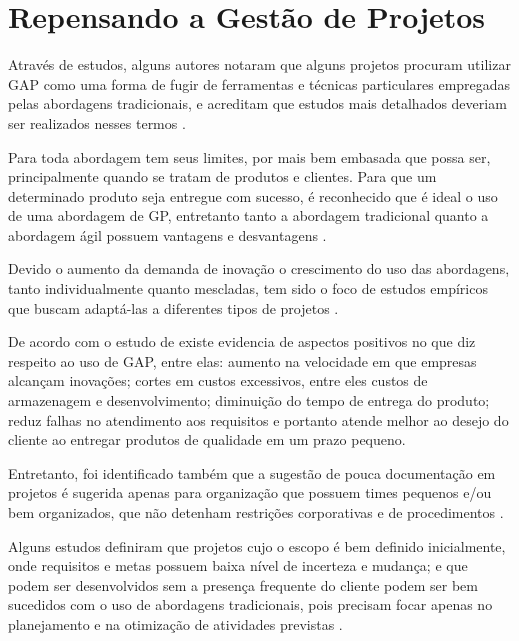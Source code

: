 \section{Repensando a Gestão de Projetos}

Através de estudos, alguns autores notaram que alguns projetos procuram utilizar GAP como uma forma de fugir de ferramentas e técnicas particulares empregadas pelas abordagens tradicionais, e acreditam que estudos mais detalhados deveriam ser realizados nesses termos \cite{conforto2010evaluating, coram2005impact, leybourne2009improvisation}.

Para  toda abordagem tem seus limites, por mais bem embasada que possa ser, principalmente quando se tratam de produtos e clientes. Para que um determinado produto seja entregue com sucesso, é reconhecido que é ideal o uso de uma abordagem de GP, entretanto tanto a abordagem tradicional quanto a abordagem ágil possuem vantagens e desvantagens \cite{aguanno2004101, turner2010perspectives}.

Devido o aumento da demanda de inovação o crescimento do uso das abordagens, tanto individualmente quanto mescladas, tem sido o foco de estudos empíricos que buscam adaptá-las a diferentes tipos de projetos \cite{conforto2010evaluating}.

De acordo com o estudo de  existe evidencia de aspectos positivos no que diz respeito ao uso de GAP, entre elas: aumento na velocidade em que empresas alcançam inovações; cortes em custos excessivos, entre eles custos de armazenagem e desenvolvimento; diminuição do tempo de entrega do produto; reduz falhas no atendimento aos requisitos e portanto atende melhor ao desejo do cliente ao entregar produtos de qualidade em um prazo pequeno.

Entretanto, foi identificado também que a sugestão de pouca documentação em projetos é sugerida apenas para organização que possuem times pequenos e/ou bem organizados, que não detenham restrições corporativas e de procedimentos \cite{boehm2005management,lindvall2004agile}.

Alguns estudos definiram que projetos cujo o escopo é bem definido inicialmente, onde requisitos e metas possuem baixa nível de incerteza e mudança; e que podem ser desenvolvidos sem a presença frequente do cliente podem ser bem sucedidos com o uso de abordagens tradicionais, pois precisam focar apenas no planejamento e na otimização de atividades previstas \cite{boehm2003using, coram2005impact, decarlo2010extreme, fernandez2008agile, shenhar2007reinventing, wysocki2011effective}.

